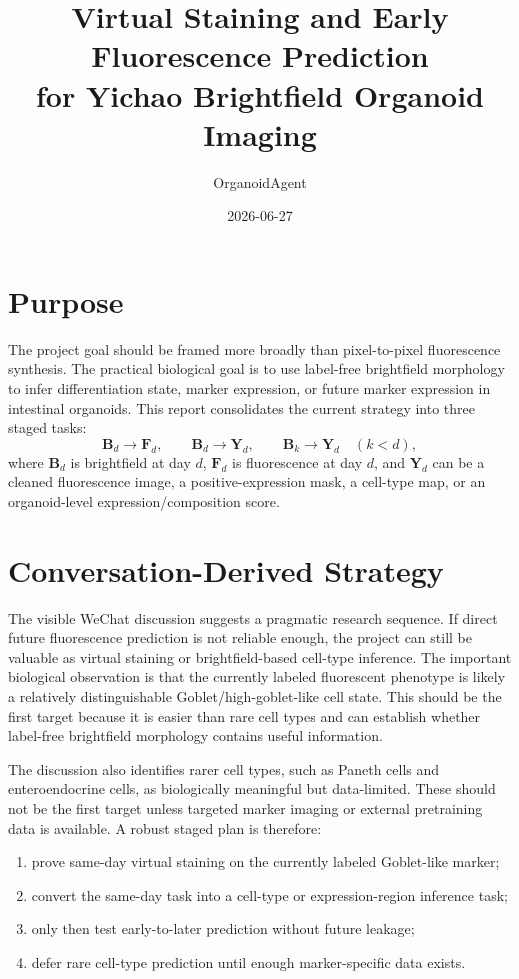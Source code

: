 \documentclass[11pt]{article}
\title{Virtual Staining and Early Fluorescence Prediction\\for Yichao Brightfield Organoid Imaging}
\author{OrganoidAgent}
\date{2026-06-27}
\newcommand{\B}{\mathbf{B}}
\newcommand{\F}{\mathbf{F}}
\newcommand{\Y}{\mathbf{Y}}
\begin{document}
\maketitle
\tableofcontents

\section{Purpose}
The project goal should be framed more broadly than pixel-to-pixel fluorescence synthesis. The practical biological goal is to use label-free brightfield morphology to infer differentiation state, marker expression, or future marker expression in intestinal organoids. This report consolidates the current strategy into three staged tasks:
\[
\B_d \rightarrow \F_d,\qquad
\B_d \rightarrow \Y_d,\qquad
\B_k \rightarrow \Y_d \quad (k<d),
\]
where \(\B_d\) is brightfield at day \(d\), \(\F_d\) is fluorescence at day \(d\), and \(\Y_d\) can be a cleaned fluorescence image, a positive-expression mask, a cell-type map, or an organoid-level expression/composition score.

\section{Conversation-Derived Strategy}
The visible WeChat discussion suggests a pragmatic research sequence. If direct future fluorescence prediction is not reliable enough, the project can still be valuable as virtual staining or brightfield-based cell-type inference. The important biological observation is that the currently labeled fluorescent phenotype is likely a relatively distinguishable Goblet/high-goblet-like cell state. This should be the first target because it is easier than rare cell types and can establish whether label-free brightfield morphology contains useful information.

The discussion also identifies rarer cell types, such as Paneth cells and enteroendocrine cells, as biologically meaningful but data-limited. These should not be the first target unless targeted marker imaging or external pretraining data is available. A robust staged plan is therefore:
\begin{enumerate}[leftmargin=1.5em]
  \item prove same-day virtual staining on the currently labeled Goblet-like marker;
  \item convert the same-day task into a cell-type or expression-region inference task;
  \item only then test early-to-later prediction without future leakage;
  \item defer rare cell-type prediction until enough marker-specific data exists.
\end{enumerate}
\end{document}
